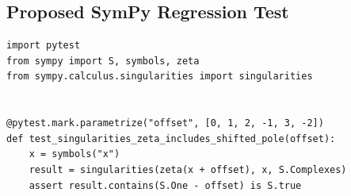 \documentclass[11pt]{article}
\begin{document}
\subsection{Proposed SymPy Regression Test}

\medskip

\begin{lstlisting}[style=bugpython]
import pytest
from sympy import S, symbols, zeta
from sympy.calculus.singularities import singularities


@pytest.mark.parametrize("offset", [0, 1, 2, -1, 3, -2])
def test_singularities_zeta_includes_shifted_pole(offset):
    x = symbols("x")
    result = singularities(zeta(x + offset), x, S.Complexes)
    assert result.contains(S.One - offset) is S.true
\end{lstlisting}
\end{document}
